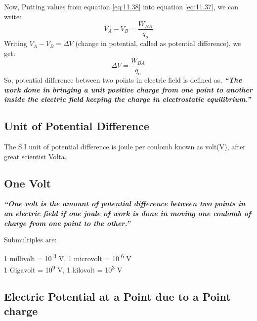 Now, Putting values from equation \ref{eq:11.38} into equation \ref{eq:11.37}, we can
write:
\begin{equation}
  V_{A} - V_{B} = \frac{W_{BA}}{q_{o}} \nonumber
\end{equation}
Writing $V_{A} - V_{B} = \Delta V$ (change in potential, called as potential difference), we get:
\begin{equation}\label{eq:11.42}
  \Delta V = \frac{W_{BA}}{q_{o}}
\end{equation}
So, potential difference between two points in electric field is defined as,
\textit{\textbf{“The work done in bringing a unit positive charge from one point to another
inside the electric field keeping the charge in electrostatic equilibrium.”}}
\subsection*{Unit of Potential Difference}
The S.I unit of potential difference is joule per coulomb known 
as volt(V), after great scientist Volta.
\subsection*{One Volt}
\textit{\textbf{“One volt is the amount of potential difference between
two points in an electric field if one joule of work is done in moving
one coulomb of charge from one point to the other.”}}

\noindent Submultiples are:
\begin{center}
  1 millivolt = 10\textsuperscript{-3} V, 1 microvolt = 10\textsuperscript{-6} V \\
  1 Gigavolt = 10\textsuperscript{9} V, 1 kilovolt = 10\textsuperscript{3} V
\end{center}

\subsection{Electric Potential at a Point due to a Point charge}


















